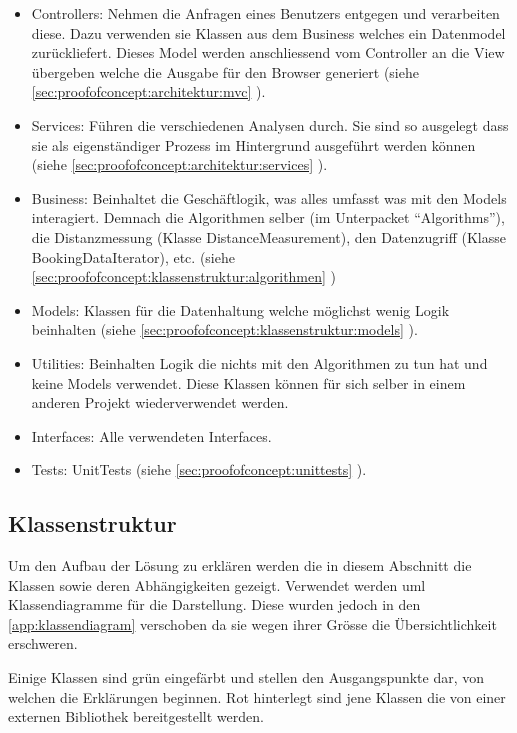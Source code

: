 \begin{itemize}
	\item Controllers: Nehmen die Anfragen eines Benutzers entgegen und verarbeiten diese. Dazu verwenden sie Klassen aus dem Business welches ein Datenmodel zurückliefert. Dieses Model werden anschliessend vom Controller an die View übergeben welche die Ausgabe für den Browser generiert (siehe \cref{sec:proofofconcept:architektur:mvc} ).
	\item Services: Führen die verschiedenen Analysen durch. Sie sind so ausgelegt dass sie als eigenständiger Prozess im Hintergrund ausgeführt werden können (siehe \cref{sec:proofofconcept:architektur:services} ).
	\item Business: Beinhaltet die Geschäftlogik, was alles umfasst was mit den Models interagiert. Demnach die Algorithmen selber (im Unterpacket "`Algorithms"'), die Distanzmessung (Klasse DistanceMeasurement), den Datenzugriff (Klasse BookingDataIterator), etc. (siehe \cref{sec:proofofconcept:klassenstruktur:algorithmen} )
	\item Models: Klassen für die Datenhaltung welche möglichst wenig Logik beinhalten (siehe \cref{sec:proofofconcept:klassenstruktur:models} ).
	\item Utilities: Beinhalten Logik die nichts mit den Algorithmen zu tun hat und keine Models verwendet. Diese Klassen können für sich selber in einem anderen Projekt wiederverwendet werden.
	\item Interfaces: Alle verwendeten Interfaces.
	\item Tests: UnitTests (siehe \cref{sec:proofofconcept:unittests} ).
\end{itemize}

\subsection{Klassenstruktur}
\label{sec:proofofconcept:klassenstruktur}
Um den Aufbau der Lösung zu erklären werden die in diesem Abschnitt die Klassen sowie deren Abhängigkeiten gezeigt. Verwendet werden \gls{uml} Klassendiagramme für die Darstellung. Diese wurden jedoch in den \cref{app:klassendiagram} verschoben da sie wegen ihrer Grösse die Übersichtlichkeit erschweren.

Einige Klassen sind grün eingefärbt und stellen den Ausgangspunkte dar, von welchen die Erklärungen beginnen. Rot hinterlegt sind jene Klassen die von einer externen Bibliothek bereitgestellt werden.

